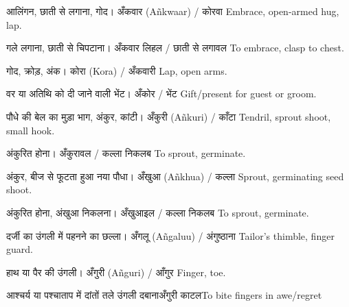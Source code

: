 
%
{आलिंगन, छाती से लगाना, गोद।}%
{अँकवार (Añkwaar) / कोरवा}%
{Embrace, open-armed hug, lap.}

%
{गले लगाना, छाती से चिपटाना।}%
{अँकवार लिहल / छाती से लगावल}%
{To embrace, clasp to chest.}

%
{गोद, क्रोड़, अंक।}%
{कोरा (Kora) / अँकवारी}%
{Lap, open arms.}

%
{वर या अतिथि को दी जाने वाली भेंट।}%
{अँकोर / भेंट}%
{Gift/present for guest or groom.}

%
{पौधे की बेल का मुड़ा भाग, अंकुर, कांटी।}%
{अँकुरी (Añkuri) / काँटा}%
{Tendril, sprout shoot, small hook.}

%
{अंकुरित होना।}%
{अँकुरावल / कल्ला निकलब}%
{To sprout, germinate.}

%
{अंकुर, बीज से फूटता हुआ नया पौधा।}%
{अँखुआ (Añkhua) / कल्ला}%
{Sprout, germinating seed shoot.}

%
{अंकुरित होना, अंखुआ निकलना।}%
{अँखुआइल / कल्ला निकलब}%
{To sprout, germinate.}

%
{दर्जी का उंगली में पहनने का छल्ला।}%
{अँगलू (Añgaluu) / अंगुष्ठाना}%
{Tailor's thimble, finger guard.}

%
{हाथ या पैर की उंगली।}%
{अँगुरी (Añguri) / आँगुर}%
{Finger, toe.}

%
{आश्चर्य या पश्चाताप में दांतों तले उंगली दबाना}{अँगुरी काटल}{To bite fingers in awe/regret}


